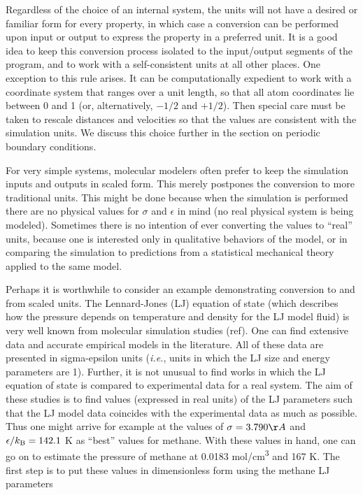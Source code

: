 \documentclass[]{article}
\begin{document}
Regardless of the choice of an internal system, the units will not have
a desired or familiar form for every property, in which case a
conversion can be performed upon input or output to express the property
in a preferred unit. It is a good idea to keep this conversion process
isolated to the input/output segments of the program, and to work with a
self-consistent units at all other places. One exception to this rule
arises. It can be computationally expedient to work with a coordinate
system that ranges over a unit length, so that all atom coordinates lie
between 0 and 1 (or, alternatively, $-1/2$ and $+1/2$). Then special care
must be taken to rescale distances and velocities so that the values are
consistent with the simulation units. We discuss this choice further in
the section on periodic boundary conditions.

For very simple systems, molecular modelers often prefer to keep the
simulation inputs and outputs in scaled form. This merely postpones the
conversion to more traditional units. This might be done because when
the simulation is performed there are no physical values for $\sigma$ and $\epsilon$ in
mind (no real physical system is being modeled). Sometimes there is no
intention of ever converting the values to ``real'' units, because one
is interested only in qualitative behaviors of the model, or in
comparing the simulation to predictions from a statistical mechanical
theory applied to the same model.

Perhaps it is worthwhile to consider an example demonstrating conversion
to and from scaled units. The Lennard-Jones (LJ) equation of state (which describes how
the pressure depends on temperature and density for the LJ model fluid)
is very well known from molecular simulation studies (ref). One can find
extensive data and accurate empirical models in the literature. All of
these data are presented in sigma-epsilon units (\emph{i.e.}, units in
which the LJ size and energy parameters are 1). Further, it is not
unusual to find works in which the LJ equation of state is compared to
experimental data for a real system. The aim of these studies is to find
values (expressed in real units) of the LJ parameters such that the LJ
model data coincides with the experimental data as much as possible.
Thus one might arrive for example at the values of $\sigma = 3.790\AA$ and $\epsilon/k_{\rm B} =
142.1$ K as ``best'' values for methane. With
these values in hand, one can go on to estimate the pressure of methane
at 0.0183 mol/cm\textsuperscript{3} and 167 K. The first step is to put
these values in dimensionless form using the methane LJ parameters
\end{document}

